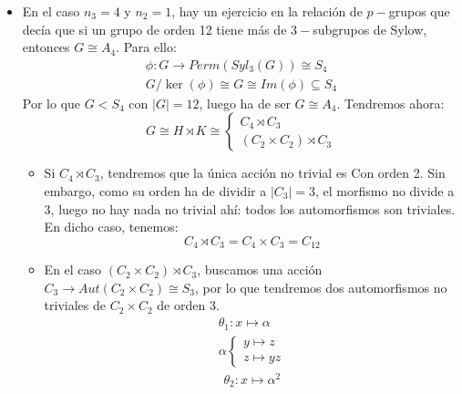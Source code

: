 \begin{itemize}
    \item En el caso $n_3 = 4$ y $n_2 = 1$, hay un ejercicio en la relación de $p-$grupos que decía que si un grupo de orden 12 tiene más de $3-$subgrupos de Sylow, entonces $G\cong A_4$. Para ello:
        \begin{gather*}
            \phi:G\to Perm(Syl_3(G)) \cong S_4 \\
            G/\ker(\phi) \cong G \cong Im(\phi) \subseteq S_4
        \end{gather*}
        Por lo que $G<S_4$ con $|G| = 12$, luego ha de ser $G\cong A_4$. Tendremos ahora:
        \begin{equation*}
            G \cong H\rtimes K \cong \left\{\begin{array}{l}
                C_4\rtimes C_3 \\
                (C_2\times C_2) \rtimes C_3
            \end{array}\right.
        \end{equation*}
        \begin{itemize}
            \item Si $C_4\rtimes C_3$, tendremos que la única acción no trivial es
                Con orden 2. Sin embargo, como su orden ha de dividir a $|C_3| = 3$, el morfismo no divide a 3, luego no hay nada no trivial ahí: todos los automorfismos son triviales. En dicho caso, tenemos:
                \begin{equation*}
                    C_4\rtimes C_3 = C_4\times C_3 = C_{12}
                \end{equation*}
            \item En el caso $(C_2\times C_2)\rtimes C_3$, buscamos una acción $C_3\to Aut(C_2\times C_2)\cong S_3$, por lo que tendremos dos automorfismos no triviales de $C_2\times C_2$ de orden 3.
                \begin{gather*}
                    \theta_1 : x \longmapsto \alpha \\
                    \alpha \left\{\begin{array}{l}
                        y \longmapsto z \\
                        z \longmapsto yz
                    \end{array}\right.
                \end{gather*}
                \begin{gather*}
                    \theta_2 : x \longmapsto \alpha^2 \\

\end{gather*}
\end{itemize}
\end{itemize}
